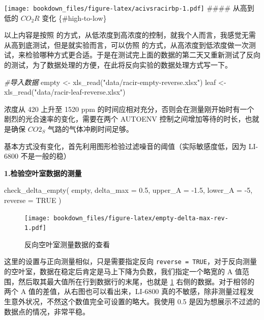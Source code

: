 \documentclass[
]{krantz}
\makeatletter
\newenvironment{Shaded}{\begin{snugshade}}{\end{snugshade}}
\newcommand{\AttributeTok}[1]{\textcolor[rgb]{0.77,0.63,0.00}{#1}}
\newcommand{\CommentTok}[1]{\textcolor[rgb]{0.56,0.35,0.01}{\textit{#1}}}
\newcommand{\ConstantTok}[1]{\textcolor[rgb]{0.00,0.00,0.00}{#1}}
\newcommand{\DecValTok}[1]{\textcolor[rgb]{0.00,0.00,0.81}{#1}}
\newcommand{\FloatTok}[1]{\textcolor[rgb]{0.00,0.00,0.81}{#1}}
\newcommand{\FunctionTok}[1]{\textcolor[rgb]{0.00,0.00,0.00}{#1}}
\newcommand{\NormalTok}[1]{#1}
\newcommand{\OtherTok}[1]{\textcolor[rgb]{0.56,0.35,0.01}{#1}}
\newcommand{\SpecialCharTok}[1]{\textcolor[rgb]{0.00,0.00,0.00}{#1}}
\newcommand{\StringTok}[1]{\textcolor[rgb]{0.31,0.60,0.02}{#1}}
\newenvironment{kframe}{%
\medskip{}
\setlength{\fboxsep}{.8em}
 \def\at@end@of@kframe{}%
 \ifinner\ifhmode%
  \def\at@end@of@kframe{\end{minipage}}%
  \begin{minipage}{\columnwidth}%
 \fi\fi%
 \def\FrameCommand##1{\hskip\@totalleftmargin \hskip-\fboxsep
 \colorbox{shadecolor}{##1}\hskip-\fboxsep
     \hskip-\linewidth \hskip-\@totalleftmargin \hskip\columnwidth}%
 \MakeFramed {\advance\hsize-\width
   \@totalleftmargin\z@ \linewidth\hsize
   \@setminipage}}%
 {\par\unskip\endMakeFramed%
 \at@end@of@kframe}
\renewenvironment{Shaded}{\begin{kframe}}{\end{kframe}}
\makeatother
\begin{document}
\texttt{[image: bookdown\_files/figure-latex/acivsracirbp-1.pdf]}
\#\#\#\# 从高到低的 \(CO_2R\) 变化 \{\#high-to-low\}

以上内容是按照 \citet{Coursolle12019} 的方式，从低浓度到高浓度的控制，就我个人而言，我感觉无需从高到底测试，但是就实验而言，可以仿照 \citet{Coursolle12019} 的方式，从高浓度到低浓度做一次测试，来检验哪种方式更合适。于是在测试完上面的数据的第二天又重新测试了反向的测试，为了数据处理的方便，在此将反向实验的数据处理方式写一下。

\begin{Shaded}
\begin{Highlighting}[]
\CommentTok{\#导入数据}
\NormalTok{empty }\OtherTok{\textless{}{-}} \FunctionTok{xls\_read}\NormalTok{(}\StringTok{"data/racir{-}empty{-}reverse.xlsx"}\NormalTok{)}
\NormalTok{leaf }\OtherTok{\textless{}{-}} \FunctionTok{xls\_read}\NormalTok{(}\StringTok{"data/racir{-}leaf{-}reverse.xlsx"}\NormalTok{)}
\end{Highlighting}
\end{Shaded}

浓度从 420 上升至 1520 ppm 的时间应相对充分，否则会在测量刚开始时有一个剧烈的光合速率的变化，需要在两个 AUTOENV 控制之间增加等待的时长，也就是确保 \(CO2_S\) 气路的气体冲刷时间足够。

基本方式没有变化，首先利用图形检验过滤噪音的阈值（实际敏感度低，因为 LI-6800 不是一般的稳）

\textbf{1.检验空叶室数据的测量}

\begin{Shaded}
\begin{Highlighting}[]
\FunctionTok{check\_delta\_empty}\NormalTok{(}
\NormalTok{  empty,}
  \AttributeTok{delta\_max =} \FloatTok{0.5}\NormalTok{,}
  \AttributeTok{upper\_A =} \SpecialCharTok{{-}}\FloatTok{1.5}\NormalTok{,}
  \AttributeTok{lower\_A =} \SpecialCharTok{{-}}\DecValTok{5}\NormalTok{,}
  \AttributeTok{reverse =} \ConstantTok{TRUE}
\NormalTok{)}
\end{Highlighting}
\end{Shaded}

\begin{figure}
\centering
\texttt{[image: bookdown\_files/figure-latex/empty-delta-max-rev-1.pdf]}
\caption{\label{fig:empty-delta-max-rev}反向空叶室测量数据的查看}
\end{figure}

这里的设置与正向测量相似，只是需要指定反向 \texttt{reverse\ =\ TRUE}，对于反向测量的空叶室，数据在稳定后肯定是马上下降为负数，我们指定一个略宽的 A 值范围，然后取其最大值所在行到数据行的末尾，也就是 \ref{fig:empty-delta-max-rev} 右侧的数据。对于相邻的两个 A 值的差值，从右图也可以看出来，LI-6800 真的不敏感，除非测量过程发生意外状况，不然这个数值完全可设置的略大。我使用 0.5 是因为想展示不过滤的数据点的情况，非常平稳。
\end{document}
